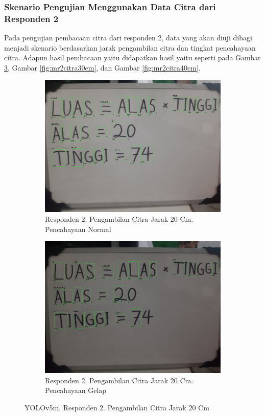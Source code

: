\subsubsection{Skenario Pengujian Menggunakan Data Citra dari Responden 2}
\label{subsubsec:mskenarioresponden2}

Pada pengujian pembacaan citra dari responden 2, data yang akan diuji dibagi menjadi skenario berdasarkan jarak pengambilan citra dan tingkat pencahayaan citra. Adapun hasil pembacaan yaitu didapatkan hasil yaitu seperti pada Gambar \ref*{fig:mr2citra20cm}, Gambar \ref*{fig:mr2citra30cm}, dan Gambar \ref*{fig:mr2citra40cm}.

\begin{figure}[H]
  \begin{subfigure}{.5\textwidth}
    \centering
    \captionsetup{width=.8\linewidth}
    \includegraphics[width=.8\linewidth]{gambar/yolov5m/responden2/ghiyas20cm00-result.jpg}
    \caption{Responden 2. Pengambilan Citra Jarak 20 Cm. Pencahayaan Normal}
    \label{fig:mr2tcitra20cm}
  \end{subfigure}%
  \begin{subfigure}{.5\textwidth}
    \centering
    \captionsetup{width=.8\linewidth}
    \includegraphics[width=.8\linewidth]{gambar/yolov5m/responden2/ghiyas20cm10-result.jpg}
    \caption{Responden 2. Pengambilan Citra Jarak 20 Cm. Pencahayaan Gelap}
    \label{fig:mr2gcitra20cm}
  \end{subfigure}
  \caption{YOLOv5m. Responden 2. Pengambilan Citra Jarak 20 Cm}
  \label{fig:mr2citra20cm}
\end{figure}

